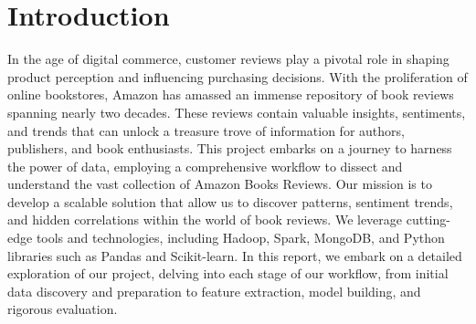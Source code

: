\section{Introduction}
In the age of digital commerce, customer reviews play a pivotal role in shaping product perception and influencing purchasing decisions.
With the proliferation of online bookstores, Amazon has amassed an immense repository of book reviews spanning nearly two decades.
These reviews contain valuable insights, sentiments, and trends that can unlock a treasure trove of information for authors, publishers, and book enthusiasts.
This project embarks on a journey to harness the power of data, employing a comprehensive workflow to dissect and understand the vast collection of Amazon Books Reviews.
Our mission is to develop a scalable solution that allow us to discover patterns, sentiment trends, and hidden correlations within the world of book reviews.
We leverage cutting-edge tools and technologies, including Hadoop, Spark, MongoDB, and Python libraries such as Pandas and Scikit-learn.
In this report, we embark on a detailed exploration of our project, delving into each stage of our workflow,
from initial data discovery and preparation to feature extraction, model building, and rigorous evaluation.
